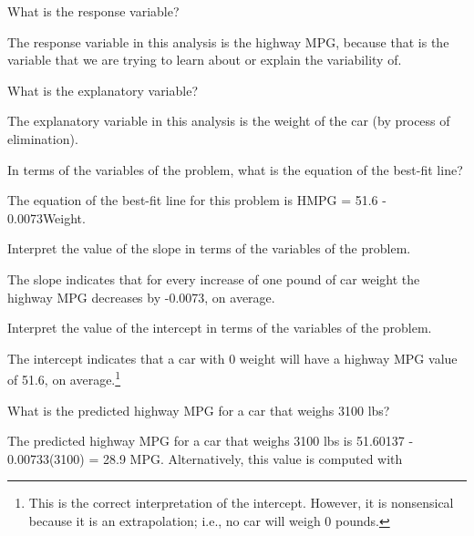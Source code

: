 \documentclass[10pt,openany]{book}\usepackage[]{graphicx}\usepackage[]{color}
\makeatletter
\newenvironment{kframe}{%
 \def\at@end@of@kframe{}%
 \ifinner\ifhmode%
  \def\at@end@of@kframe{\end{minipage}}%
  \begin{minipage}{\columnwidth}%
 \fi\fi%
 \def\FrameCommand##1{\hskip\@totalleftmargin \hskip-\fboxsep
 \colorbox{shadecolor}{##1}\hskip-\fboxsep
     \hskip-\linewidth \hskip-\@totalleftmargin \hskip\columnwidth}%
 \MakeFramed {\advance\hsize-\width
   \@totalleftmargin\z@ \linewidth\hsize
   \@setminipage}}%
 {\par\unskip\endMakeFramed%
 \at@end@of@kframe}
\newenvironment{knitrout}{}{} %
\makeatother
\begin{document}
\begin{QAlist}
  \item What is the response variable?
  \begin{QAlist}
    \item The response variable in this analysis is the highway MPG, because that is the variable that we are trying to learn about or explain the variability of.
  \end{QAlist}
  \item What is the explanatory variable?
  \begin{QAlist}
    \item The explanatory variable in this analysis is the weight of the car (by process of elimination).
  \end{QAlist}
  \item In terms of the variables of the problem, what is the equation of the best-fit line?
  \begin{QAlist}
    \item The equation of the best-fit line for this problem is HMPG = 51.6 - 0.0073Weight.
  \end{QAlist}
  \item Interpret the value of the slope in terms of the variables of the problem.
  \begin{QAlist}
    \item The slope indicates that for every increase of one pound of car weight the highway MPG decreases by -0.0073, on average.
  \end{QAlist}
  \item Interpret the value of the intercept in terms of the variables of the problem.
  \begin{QAlist}
    \item The intercept indicates that a car with 0 weight will have a highway MPG value of 51.6, on average.\footnote{This is the correct interpretation of the intercept. However, it is nonsensical because it is an extrapolation; i.e., no car will weigh 0 pounds.}
  \end{QAlist}
  \item What is the predicted highway MPG for a car that weighs 3100 lbs?
  \begin{QAlist}
    \item The predicted highway MPG for a car that weighs 3100 lbs is 51.60137 - 0.00733(3100) = 28.9 MPG. Alternatively, this value is computed with
\begin{knitrout}
\color{fgcolor}\begin{kframe}

\end{kframe}
\end{knitrout}
\end{QAlist}
\end{QAlist}
\end{document}
